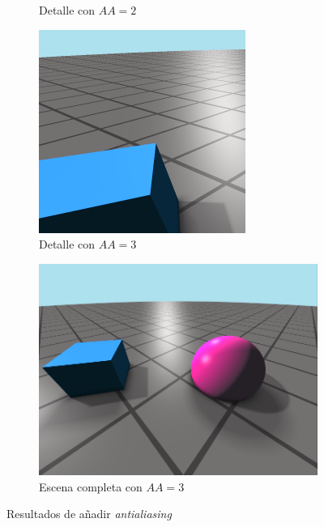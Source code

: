 \begin{figure}[htbp]
\begin{subfigure}[b]{0.3\textwidth}
        \caption{Detalle con $AA = 2$}
    \end{subfigure}
    \hfill
    \begin{subfigure}[b]{0.3\textwidth}
        \centering
        \includegraphics[width=\textwidth]{Plantilla-TFG-master/img/aa3_zoom.png}
        \caption{Detalle con $AA = 3$}
    \end{subfigure}

    \medskip
    
    \begin{subfigure}[b]{\textwidth}
        \centering
        \includegraphics[width=\textwidth]{Plantilla-TFG-master/img/escena9_AA3.png}
        \caption{Escena completa con $AA=3$}
    \end{subfigure}
    
    \caption{Resultados de añadir \textit{antialiasing}}
    \label{fig:resAA}
\end{figure}





